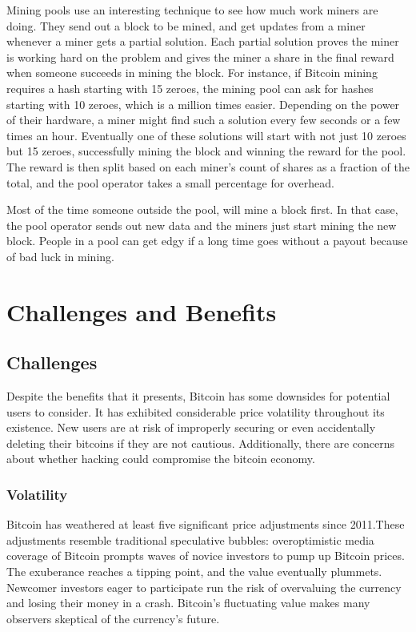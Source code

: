 Mining pools use an interesting technique to see how much work miners are doing. They send out a block to be mined, and get updates from a miner whenever a miner gets a partial solution. Each partial solution proves the miner is working hard on the problem and gives the miner a share in the final reward when someone succeeds in mining the block.
For instance, if Bitcoin mining requires a hash starting with 15 zeroes, the mining pool can ask for hashes starting with 10 zeroes, which is a million times easier. Depending on the power of their hardware, a miner might find such a solution every few seconds or a few times an hour. Eventually one of these solutions will start with not just 10 zeroes but 15 zeroes, successfully mining the block and winning the reward for the pool. The reward is then split based on each miner's count of shares as a fraction of the total, and the pool operator takes a small percentage for overhead.

Most of the time someone outside the pool, will mine a block first. In that case, the pool operator sends out new data and the miners just start mining the new block. People in a pool can get edgy if a long time goes without a payout because of bad luck in mining.


\chapter{Challenges and Benefits}

\section{Challenges}
Despite the benefits that it presents, Bitcoin has some downsides
for potential users to consider. It has exhibited considerable
price volatility throughout its existence. New users are at risk of
improperly securing or even accidentally deleting their bitcoins
if they are not cautious. Additionally, there are concerns about
whether hacking could compromise the bitcoin economy.

\subsection{Volatility}
Bitcoin has weathered at least five significant price adjustments
since 2011.These adjustments resemble traditional speculative
bubbles: overoptimistic media coverage of Bitcoin prompts waves
of novice investors to pump up Bitcoin prices. The exuberance
reaches a tipping point, and the value eventually plummets.
Newcomer investors eager to participate run the risk of overvaluing
the currency and losing their money in a crash. Bitcoin’s fluctuating
value makes many observers skeptical of the currency’s
future.

